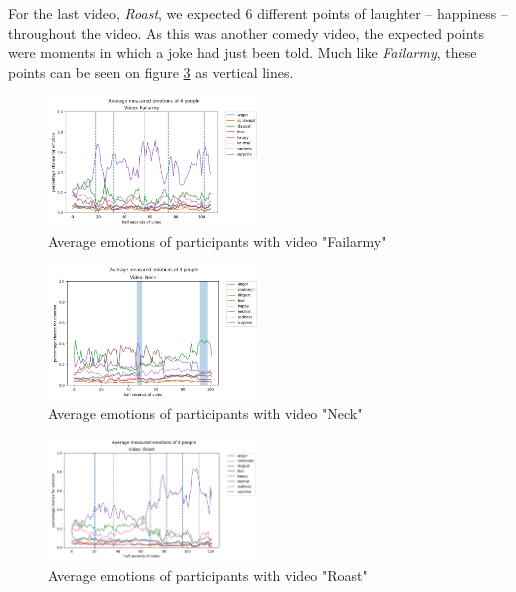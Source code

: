 \documentclass[sigconf]{acmart}
\begin{document}
For the last video, \emph{Roast}, we expected 6 different points of laughter -- happiness -- throughout
the video. As this was another comedy video, the expected points were moments in which a joke had just been told.
Much like \emph{Failarmy}, these points can be seen on figure \ref{chart_roast} as vertical lines.

\begin{figure}[H]
    \centering
    \includegraphics[width=0.5\textwidth, scale=1]{chart_failarmy_small.png}
    \caption{Average emotions of participants with video "Failarmy"}
    \label{chart_failarmy}
\end{figure}

\begin{figure}[H]
    \centering
    \includegraphics[width=0.5\textwidth, scale=1]{chart_neck_small.png}
    \caption{Average emotions of participants with video "Neck"}
    \label{chart_neck}
\end{figure}

\begin{figure}[H]
    \centering
    \includegraphics[width=0.5\textwidth, scale=1]{chart_roast_small.png}
    \caption{Average emotions of participants with video "Roast"}
    \label{chart_roast}
\end{figure}
\end{document}
